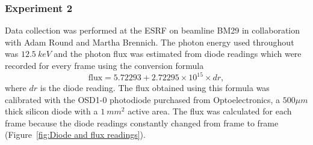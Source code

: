 \subsubsection{Experiment 2}
\label{subs:Experiment 2 - data col}
Data collection was performed at the ESRF on beamline BM29 in collaboration with Adam Round and Martha Brennich.
The photon energy used throughout was $12.5\ keV$ and the photon flux was estimated from diode readings which were recorded for every frame using the conversion formula
\begin{equation}
    \text{flux} = 5.72293 + 2.72295 \times 10^{15} \times dr,
\end{equation}
where $dr$ is the diode reading.
The flux obtained using this formula was calibrated with the OSD1-0 photodiode purchased from Optoelectronics, a $500 \mu m$ thick silicon diode with a $ 1\ mm^2 $ active area.
The flux was calculated for each frame because the diode readings constantly changed from frame to frame (Figure~\ref{fig:Diode and flux readings}).
